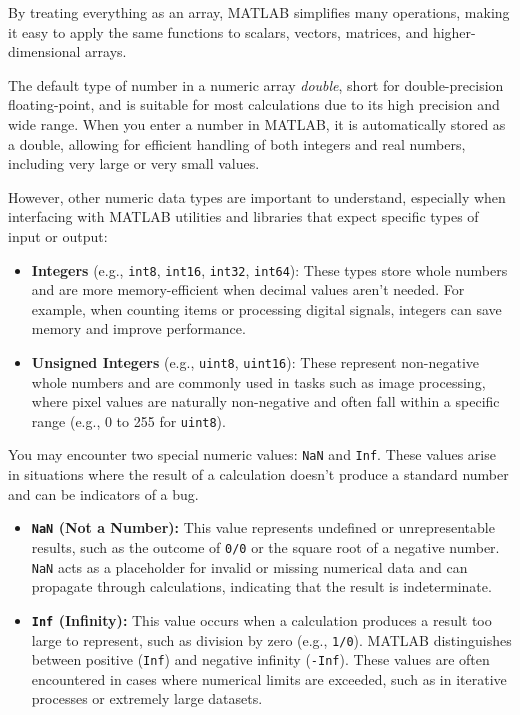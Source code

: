 \documentclass[../../book.tex]{subfiles}
\begin{document}
By treating everything as an array, MATLAB simplifies many operations, making it easy to apply the same functions to scalars, vectors, matrices, and higher-dimensional arrays. 

The default type of number in a numeric array  \emph{double}, short for double-precision floating-point, and is suitable for most calculations due to its high precision and wide range. When you enter a number in MATLAB, it is automatically stored as a double, allowing for efficient handling of both integers and real numbers, including very large or very small values.

However, other numeric data types are important to understand, especially when interfacing with MATLAB utilities and libraries that expect specific types of input or output:

\begin{itemize}
    \item \textbf{Integers} (e.g., \texttt{int8}, \texttt{int16}, \texttt{int32}, \texttt{int64}): These types store whole numbers and are more memory-efficient when decimal values aren’t needed. For example, when counting items or processing digital signals, integers can save memory and improve performance.

    \item \textbf{Unsigned Integers} (e.g., \texttt{uint8}, \texttt{uint16}): These represent non-negative whole numbers and are commonly used in tasks such as image processing, where pixel values are naturally non-negative and often fall within a specific range (e.g., 0 to 255 for \texttt{uint8}).
\end{itemize}

You may encounter two special numeric values: \texttt{NaN} and \texttt{Inf}. These values arise in situations where the result of a calculation doesn’t produce a standard number and can be indicators of a bug.

\begin{itemize}
    \item \textbf{\texttt{NaN} (Not a Number):} This value represents undefined or unrepresentable results, such as the outcome of \texttt{0/0} or the square root of a negative number. \texttt{NaN} acts as a placeholder for invalid or missing numerical data and can propagate through calculations, indicating that the result is indeterminate.

    \item \textbf{\texttt{Inf} (Infinity):} This value occurs when a calculation produces a result too large to represent, such as division by zero (e.g., \texttt{1/0}). MATLAB distinguishes between positive (\texttt{Inf}) and negative infinity (\texttt{-Inf}). These values are often encountered in cases where numerical limits are exceeded, such as in iterative processes or extremely large datasets.
\end{itemize}
\end{document}
